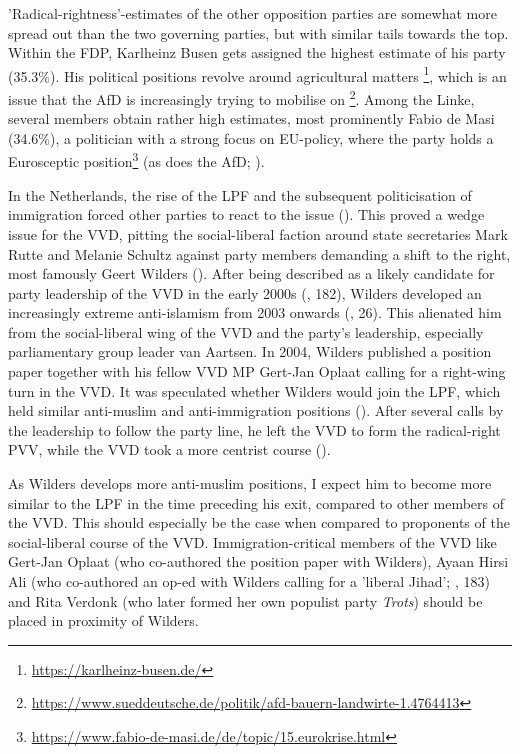 \documentclass{article}
\begin{document}
'Radical-rightness'-estimates of the other opposition parties are somewhat more spread out than the two governing parties, but with similar tails towards the top. Within the FDP, Karlheinz Busen gets assigned the highest estimate of his party (35.3\%). His political positions revolve around agricultural matters \footnote{\url{https://karlheinz-busen.de/}}, which is an issue that the AfD is increasingly trying to mobilise on \footnote{\url{https://www.sueddeutsche.de/politik/afd-bauern-landwirte-1.4764413}}.  Among the Linke, several members obtain rather high estimates, most prominently Fabio de Masi (34.6\%), a politician with a strong focus on EU-policy, where the party holds a Eurosceptic position\footnote{\url{https://www.fabio-de-masi.de/de/topic/15.eurokrise.html}} (as does the AfD; \cite{ThePopulist2019}).\par


In the Netherlands, the rise of the LPF and the subsequent politicisation of immigration forced other parties to react to the issue (\cite{DeVries2012c, Pennings2003}). This proved a wedge issue for the VVD, pitting the social-liberal faction around state secretaries Mark Rutte and Melanie Schultz against party members demanding a shift to the right, most famously Geert Wilders (\cite{VandeWardt2014, Vossen2011}). After being described as a likely candidate for party leadership of the VVD in the early 2000s (\cite{Vossen2011}, 182), Wilders developed an increasingly extreme anti-islamism from 2003 onwards (\cite{Vossen2010}, 26). This alienated him from the social-liberal wing of the VVD and the party's leadership, especially parliamentary group leader van Aartsen. In 2004, Wilders published a position paper together with his fellow VVD MP Gert-Jan Oplaat calling for a right-wing turn in the VVD. It was speculated whether Wilders would join the LPF, which held similar anti-muslim and anti-immigration positions (\cite{Parool2004Wilders, Handelsblad2008Wilders}). After several calls by the leadership to follow the party line, he left the VVD to form the radical-right PVV, while the VVD took a more centrist course (\cite{Vossen2010, Vossen2011}). \par

 As Wilders develops more anti-muslim positions, I expect him to become more similar to the LPF in the time preceding his exit, compared to other members of the VVD. This should especially be the case when compared to proponents of the social-liberal course of the VVD. Immigration-critical members of the VVD like Gert-Jan Oplaat (who co-authored the position paper with Wilders), Ayaan Hirsi Ali (who co-authored an op-ed with Wilders calling for a 'liberal Jihad'; \cite{Vossen2011}, 183) and Rita Verdonk (who later formed her own populist party \textit{Trots}) should be placed in proximity of Wilders. \par
\end{document}
